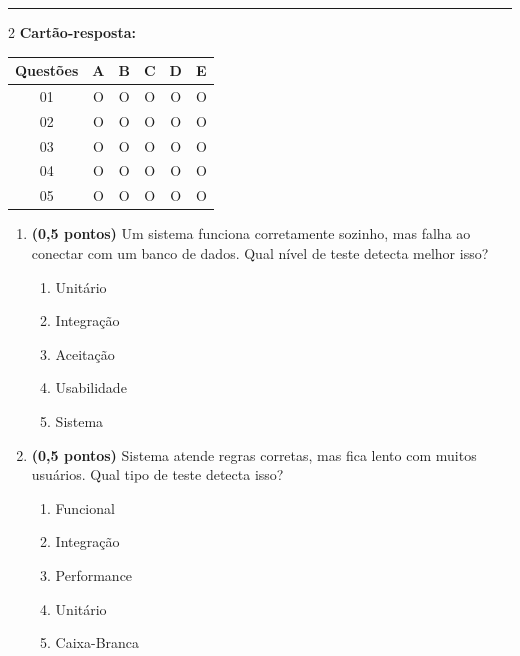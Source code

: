 \documentclass[a4paper,12pt]{article}
\begin{document}
\vspace{0.5cm}
\noindent\rule{\textwidth}{1pt}

\begin{multicols}{2}
\raggedcolumns
\textbf{Cartão-resposta:}

\vspace{0.2cm}

\begin{tabular}{|c|c|c|c|c|c|}
\hline
\textbf{Questões} & A & B & C & D & E \\
\hline
01 & O & O & O & O & O \\
\hline
02 & O & O & O & O & O \\
\hline
03 & O & O & O & O & O \\
\hline
04 & O & O & O & O & O \\
\hline
05 & O & O & O & O & O \\
\hline
\end{tabular}

\vspace{0.7cm}

\begin{enumerate}[leftmargin=*]

\item \textbf{(0,5 pontos)} Um sistema funciona corretamente sozinho, mas falha ao conectar com um banco de dados. Qual nível de teste detecta melhor isso?

\begin{enumerate}[label=(\Alph*)]
\item Unitário
\item Integração
\item Aceitação
\item Usabilidade
\item Sistema
\end{enumerate}

\vspace{0.2cm}

\item \textbf{(0,5 pontos)} Sistema atende regras corretas, mas fica lento com muitos usuários. Qual tipo de teste detecta isso?

\begin{enumerate}[label=(\Alph*)]
\item Funcional
\item Integração
\item Performance
\item Unitário
\item Caixa-Branca
\end{enumerate}


\end{enumerate}
\end{multicols}
\end{document}
